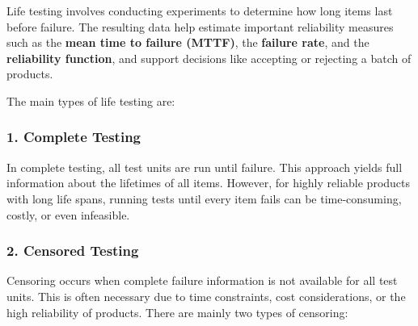 \documentclass[twoside]{book}
\begin{document}
Life testing involves conducting experiments to determine how long items last before failure. The resulting data help estimate important reliability measures such as the \textbf{mean time to failure (MTTF)}, the \textbf{failure rate}, and the \textbf{reliability function}, and support decisions like accepting or rejecting a batch of products.

The main types of life testing are:

\subsubsection{1. Complete Testing}

In complete testing, all test units are run until failure. This approach yields full information about the lifetimes of all items. However, for highly reliable products with long life spans, running tests until every item fails can be time-consuming, costly, or even infeasible.

\subsubsection{2. Censored Testing}

Censoring occurs when complete failure information is not available for all test units. This is often necessary due to time constraints, cost considerations, or the high reliability of products. There are mainly two types of censoring:
\end{document}
